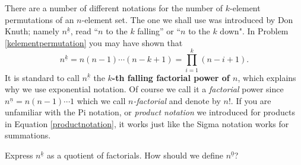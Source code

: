 \ep 


There are a number of different notations for the number of $k$-element
permutations of an $n$-element set.  The one we shall use was introduced by
Don Knuth; namely $n^{\underline{k}}$, read ``$n$ to the $k$ falling'' or
``$n$ to the $k$ down". In Problem \ref{kelementpermutation} you may have
shown that 
\begin{equation}n^{\underline{k}} =n(n-1)\cdots (n-k+1)= \prod_{i=1}^k(
n-i+1).\label{productnotation}
\end{equation}
  It is standard to call $n^{\underline{k}}$  the
{\bf
$k$-th falling factorial power of $n$}, which explains why we use exponential
notation.  Of course we call it a {\em factorial} power since
$n^{\underline{n}} = n(n-1)\cdots 1$ which we call {\em $n$-factorial} and
denote by
$n!$.  If you are unfamiliar with the Pi
notation, or {\em product notation} we introduced for products in Equation
\ref{productnotation}, it works just like the Sigma notation works for
summations.

\bp
\iteme Express $n^{\underline{k}}$ as a quotient of factorials.
\itemi How should we define $n^{\underline{0}}$?
\ep


